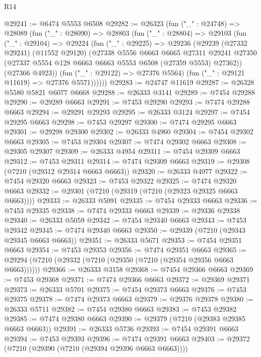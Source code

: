 \begin{lexlean}{R14}
\begin{coremodule}
@29241 := @6474 @5553 @6508
@29282 := @26323
    (fun ("_" : @24748) =>
    @28089
      (fun ("_" : @28090) =>
      @28803
        (fun ("_" : @28804) =>
        @29103
          (fun ("_" : @29104) =>
          @29224
            (fun ("_" : @29225) =>
            @29236
              (@29239
                (@27332 @29241)
                (@11552 @29120)
                (@27338
                  @5556
                  @6663
                  @6665
                  @27311
                  @29241
                  @27350
                  (@27337 @5554 @128 @6663 @6663 @5553 @6508 (@27359 @5553) @27362))
                (@27366 @4923))
              (fun ("_" : @29122) => @27376 @5564)
              (fun ("_" : @29121 @11619) => @27376 @5571))))))
@29283 := @24747 @11619
@29287 := @26328 @5580 @5821 @6077 @6668
@29288 := @26333 @3141
@29289 := @7454 @29288
@29290 := @29289 @6663
@29291 := @7453 @29290
@29293 := @7474 @29288 @6663
@29294 := @29291 @29293
@29295 := @26333 @3124
@29297 := @7454 @29295 @6663
@29298 := @7453 @29297
@29300 := @7474 @29295 @6663
@29301 := @29298 @29300
@29302 := @26333 @4960
@29304 := @7454 @29302 @6663
@29305 := @7453 @29304
@29307 := @7474 @29302 @6663
@29308 := @29305 @29307
@29309 := @26333 @4954
@29311 := @7454 @29309 @6663
@29312 := @7453 @29311
@29314 := @7474 @29309 @6663
@29319 := @29308 (@7210 (@29312 @29314 @6663 @6663))
@29320 := @26333 @4977
@29322 := @7454 @29320 @6663
@29323 := @7453 @29322
@29325 := @7474 @29320 @6663
@29332 := @29301 (@7210 (@29319 (@7210 (@29323 @29325 @6663 @6663))))
@29333 := @26333 @5091
@29335 := @7454 @29333 @6663
@29336 := @7453 @29335
@29338 := @7474 @29333 @6663
@29339 := @29336 @29338
@29340 := @26333 @5059
@29342 := @7454 @29340 @6663
@29343 := @7453 @29342
@29345 := @7474 @29340 @6663
@29350 := @29339 (@7210 (@29343 @29345 @6663 @6663))
@29351 := @26333 @5671
@29353 := @7454 @29351 @6663
@29354 := @7453 @29353
@29356 := @7474 @29351 @6663
@29365 := @29294 (@7210 (@29332 (@7210 (@29350 (@7210 (@29354 @29356 @6663 @6663))))))
@29366 := @26333 @3158
@29368 := @7454 @29366 @6663
@29369 := @7453 @29368
@29371 := @7474 @29366 @6663
@29372 := @29369 @29371
@29373 := @26333 @5701
@29375 := @7454 @29373 @6663
@29376 := @7453 @29375
@29378 := @7474 @29373 @6663
@29379 := @29376 @29378
@29380 := @26333 @5711
@29382 := @7454 @29380 @6663
@29383 := @7453 @29382
@29385 := @7474 @29380 @6663
@29390 := @29379 (@7210 (@29383 @29385 @6663 @6663))
@29391 := @26333 @5736
@29393 := @7454 @29391 @6663
@29394 := @7453 @29393
@29396 := @7474 @29391 @6663
@29403 := @29372 (@7210 (@29390 (@7210 (@29394 @29396 @6663 @6663))))

\end{coremodule}
\end{lexlean}
